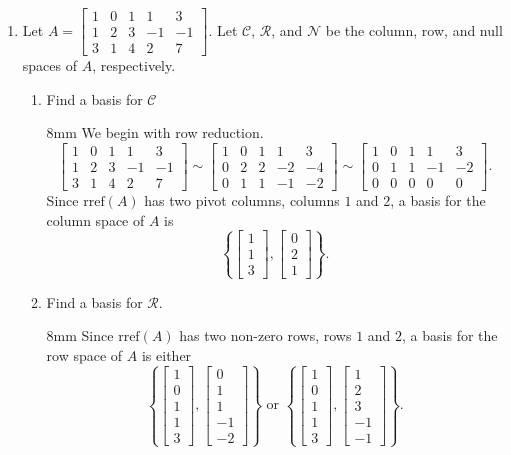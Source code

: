 \documentclass[letter]{article}
\newcommand{\mat}[1]{\begin{bmatrix}#1\end{bmatrix}}
\newcommand{\Rref}{\mathrm{rref}}
\newenvironment{answer}{
	\begin{adjustwidth}{8mm}{} \vspace{2mm}}{\end{adjustwidth} \vspace{2mm}
}
\theoremstyle{plain}
\theoremstyle{definition}
\theoremstyle{remark}
\begin{document}
\begin{enumerate}
		\item Let $A = \mat{1 & 0 & 1 & 1 & 3 \\ 1 & 2 & 3 & -1 & -1 \\ 3 & 1 & 4 & 2 & 7}$.  Let $\mathcal{C}$, $\mathcal{R}$, and $\mathcal{N}$ be the column, row, and null spaces of $A$, respectively.
		\begin{enumerate}
			\item Find a basis for $\mathcal{C}$
			\begin{answer}
				We begin with row reduction. 
				\[
				\left[\begin{array}{ccccc}
					1 & 0 & 1 & 1 & 3 \\
					1 & 2 & 3 & -1 & -1 \\
					3 & 1 & 4 & 2  & 7
				\end{array}\right] \sim 
				\left[\begin{array}{ccccc}
					1 & 0 & 1 & 1 & 3 \\
					0 & 2 & 2 & -2 & -4 \\
					0 & 1 & 1 & -1 & -2
				\end{array}\right] \sim 
				\left[\begin{array}{ccccc}
					1 & 0 & 1 & 1 & 3 \\
					0 & 1 & 1 & -1 & -2 \\
					0 & 0 & 0 & 0 & 0
				\end{array}\right].
				\]
				Since $\Rref(A)$ has two pivot columns, columns $1$ and $2$, a basis for the column space of $A$ is
				\[
				\left\{\mat{1\\1\\3}, \mat{0\\2\\1}\right\}.
				\]
			\end{answer}
			\item Find a basis for $\mathcal{R}$.
			\begin{answer}
				Since $\Rref(A)$ has two non-zero rows, rows $1$ and $2$, a basis for the row space of $A$ is either
				\[
				\left\{\mat{1\\0\\1\\1\\3}, \mat{0\\1\\1\\-1\\-2}\right\} \text{ or } \left\{\mat{1\\0\\1\\1\\3}, \mat{1\\2\\3\\-1\\-1}\right\}.
\]
\end{answer}
\end{enumerate}
\end{enumerate}
\end{document}
